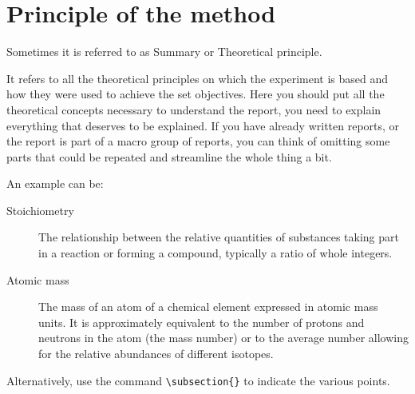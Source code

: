 \section{Principle of the method}
Sometimes it is referred to as Summary or Theoretical principle.

It refers to all the theoretical principles on which the experiment is based and how they were used to achieve the set objectives. Here you should put all the theoretical concepts necessary to understand the report, you need to explain everything that deserves to be explained. If you have already written reports, or the report is part of a macro group of reports, you can think of omitting some parts that could be repeated and streamline the whole thing a bit.

An example can be:
\begin{description}
	\item[Stoichiometry] The relationship between the relative quantities of substances taking part in a reaction or forming a compound, typically a ratio of whole integers.
	\item[Atomic mass] The mass of an atom of a chemical element expressed in atomic mass units. It is approximately equivalent to the number of protons and neutrons in the atom (the mass number) or to the average number allowing for the relative abundances of different isotopes. 
\end{description} 

Alternatively, use the command \verb|\subsection{}| to indicate the various points.
